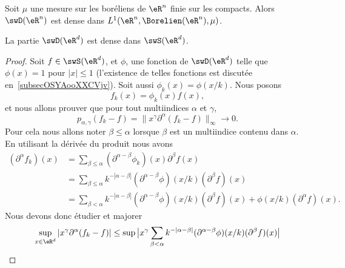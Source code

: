 \begin{theorem}      \label{ThoRWEoqY}
    Soit \( \mu\) une mesure sur les boréliens de \( \eR^n\) finie sur les compacts. Alors \( \swD(\eR^n)\) est dense dans \( L^1(\eR^n,\Borelien(\eR^n),\mu)\).
\end{theorem}

\begin{proposition}      \label{PROPooJNQZooIRbJei}
    La partie \( \swD(\eR^d)\) est dense dans \( \swS(\eR^d)\).
\end{proposition}

\begin{proof}
    Soit \( f\in \swS(\eR^d)\), et \( \phi\), une fonction de \( \swD(\eR^d)\) telle que \( \phi(x)=1\) pour \(| x |\leq 1 \) (l'existence de telles fonctions est discutée en~\ref{subsecOSYAooXXCVjv}). Soit aussi \( \phi_k(x)=\phi(x/k)\). Nous posons
    \begin{equation}
        f_k(x)=\phi_k(x)f(x),
    \end{equation}
    et nous allons prouver que pour tout multiindices \( \alpha\) et \( \gamma\),
    \begin{equation}
        p_{\alpha,\gamma}(f_k-f)=\| x^{\gamma}\partial^{\alpha}(f_k-f)  \|_{\infty}\to 0.
    \end{equation}
    Pour cela nous allons noter \(  \beta\leq \alpha  \) lorsque \( \beta\) est un multiindice contenu dans \( \alpha\). En utilisant la dérivée du produit nous avons
    \begin{subequations}
        \begin{align}
            (\partial^{\alpha}f_k)(x)&=\sum_{\beta\leq \alpha}(\partial^{\alpha-\beta}\phi_k)(x)\partial^{\beta}f(x)\\
            &=\sum_{\beta\leq \alpha}k^{-| \alpha-\beta |}(\partial^{\alpha-\beta}\phi)(x/k)(\partial^{\beta}f)(x)\\
            &=\sum_{\beta< \alpha}k^{-| \alpha-\beta |}(\partial^{\alpha-\beta}\phi)(x/k)(\partial^{\beta}f)(x) + \phi(x/k)(\partial^{\alpha}f)(x).
        \end{align}
    \end{subequations}
    Nous devons donc étudier et majorer
    \begin{equation}
        \begin{aligned}[]
        \sup_{x\in \eR^d}| x^{\gamma}\partial^{\alpha}(f_k-f) |&\leq \sup\big| x^{\gamma}  \sum_{\beta< \alpha}k^{-| \alpha-\beta |}(\partial^{\alpha-\beta}\phi)(x/k)(\partial^{\beta}f)(x)  \big|\\

\end{aligned}
\end{equation}
\end{proof}
